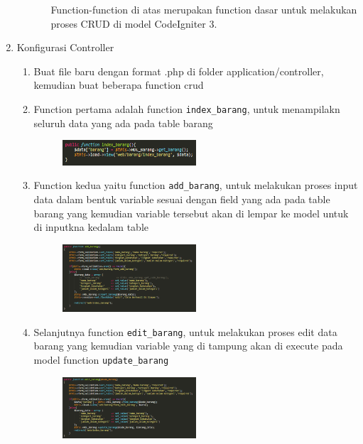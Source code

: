 \begin{enumerate}
\begin{enumerate}
\begin{enumerate}
            \par Function-function di atas merupakan function dasar untuk melakukan proses CRUD di model CodeIgniter 3.
        \end{enumerate}
    \end{enumerate}
    \item Konfigurasi Controller
    \begin{enumerate}
        \item Buat file baru dengan format .php di folder application/controller, kemudian buat beberapa function crud
        \item Function pertama adalah function \verb|index_barang|, untuk menampilakn seluruh data yang ada pada table barang
    		\begin{figure}[!htbp]
        		\centering
        		\includegraphics[width=0.5\textwidth]{figures/Controller1.PNG}
        		\label{Controller1}
    		\end{figure}
    		
        \item Function kedua yaitu function \verb|add_barang|, untuk melakukan proses input data dalam bentuk variable sesuai dengan field yang ada pada table barang  yang kemudian variable tersebut akan di lempar ke model untuk di inputkna kedalam table
    		\begin{figure}[!htbp]
        		\centering
        		\includegraphics[width=0.5\textwidth]{figures/Controller2.PNG}
        		\label{Controller2}
    		\end{figure}
    		
    	\item Selanjutnya function \verb|edit_barang|, untuk melakukan proses edit data barang yang kemudian variable yang di tampung akan di execute pada model function \verb|update_barang|
    		\begin{figure}[!htbp]
        		\centering
        		\includegraphics[width=0.5\textwidth]{figures/Controller3.PNG}
        		\label{Controller3}
    		\end{figure}
    		

\end{enumerate}
\end{enumerate}
